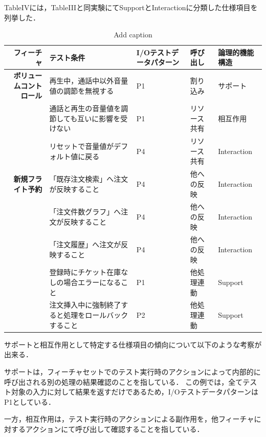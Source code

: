 TableIVには，TableIIIと同実験にてSupportとInteractionに分類した仕様項目を列挙した．

\begin{table}[htbp]
  \centering
  \caption{Add caption}
    \begin{tabular}{|r|p{8em}|p{4em}|p{4em}|p{5em}|}
    \hline
    \multicolumn{1}{|p{4em}|}{\textbf{フィーチャ}} & \textbf{テスト条件} & \textbf{I/Oテストデータパターン} & \textbf{呼び出し} & \textbf{論理的機能構造} \bigstrut\\
    \hline
    \multicolumn{1}{|p{4em}|}{\textbf{ボリュームコントロール}} & 再生中，通話中以外音量値の調節を無視する & P1　   & 割り込み  & サポート \bigstrut\\
\cline{2-5}          & 通話と再生の音量値を調節しても互いに影響を受けない & P1    & リソース共有 & 相互作用 \bigstrut\\
\cline{2-5}          & リセットで音量値がデフォルト値に戻る & P4　　  & リソース共有 & Interaction \bigstrut\\
    \hline
    \multicolumn{1}{|p{4em}|}{\textbf{新規フライト予約}} & 「既存注文検索」へ注文が反映すること & P4　   & 他への反映 & Interaction \bigstrut\\
\cline{2-5}          & 「注文件数グラフ」へ注文が反映すること & P4　   & 他への反映 & Interaction \bigstrut\\
\cline{2-5}          & 「注文履歴」へ注文が反映すること & P4    & 他への反映 & Interaction \bigstrut\\
\cline{2-5}          & 登録時にチケット在庫なしの場合エラーになること & P1    & 他処理連動 & Support \bigstrut\\
\cline{2-5}          & 注文挿入中に強制終了すると処理をロールバックすること & P2    & 他処理連動 & Support \bigstrut\\
    \hline
    \end{tabular}%
  \label{tab:addlabel}%
\end{table}%

サポートと相互作用として特定する仕様項目の傾向について以下のような考察が出来る．

サポートは，フィーチャセットでのテスト実行時のアクションによって内部的に呼び出される別の処理の結果確認のことを指している．
この例では，全てテスト対象の入力に対して結果を返すだけであるため，I/OテストデータパターンはP1としている．

一方，相互作用は，テスト実行時のアクションによる副作用を，他フィーチャに対するアクションにて呼び出して確認することを指している．

